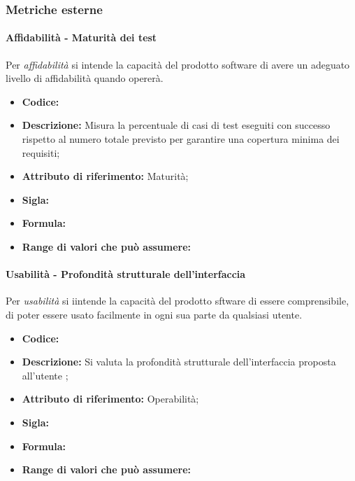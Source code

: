 \subsubsection{Metriche esterne}

\paragraph{Affidabilità - Maturità dei test}
Per \textit{affidabilità} si intende la capacità del prodotto software di avere un adeguato livello di affidabilità quando opererà.

\begin{itemize}
    \item \textbf{Codice:} 
    \item \textbf{Descrizione:} Misura la percentuale di casi di test eseguiti con successo rispetto al numero totale previsto per garantire una copertura minima dei requisiti;
    \item \textbf{Attributo di riferimento:} Maturità;
    \item \textbf{Sigla:}
    \item \textbf{Formula:}
    \item \textbf{Range di valori che può assumere:}
\end{itemize}


\paragraph{Usabilità - Profondità strutturale dell'interfaccia}
Per \textit{usabilità} si iintende la capacità del prodotto sftware di essere comprensibile, di poter essere usato facilmente in ogni sua parte da qualsiasi utente.

\begin{itemize}
    \item \textbf{Codice:} 
    \item \textbf{Descrizione:} Si valuta la profondità strutturale dell'interfaccia proposta all'utente ;
    \item \textbf{Attributo di riferimento:} Operabilità;
    \item \textbf{Sigla:}
    \item \textbf{Formula:}
    \item \textbf{Range di valori che può assumere:}
\end{itemize}